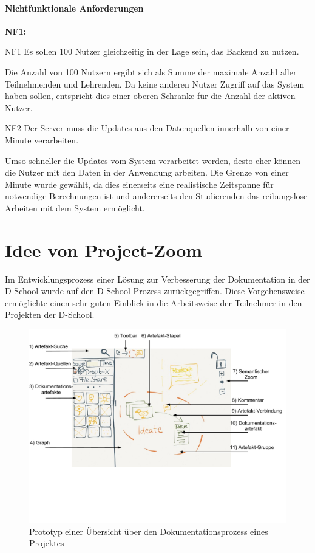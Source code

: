 \paragraph{Nichtfunktionale Anforderungen}
\label{sec:nonfunctional}

\begin{labeling}{\textbf{NF1:}}
  \item[NF1\label{itm:nf1}] Es sollen 100 Nutzer gleichzeitig in der Lage sein, das \gls{Backend} zu nutzen.

  Die Anzahl von 100 Nutzern ergibt sich als Summe der maximale Anzahl aller Teilnehmenden und Lehrenden. Da keine anderen Nutzer Zugriff auf das System haben sollen, entspricht dies einer oberen Schranke für die Anzahl der aktiven Nutzer. 

  \item[NF2\label{itm:nf2}]  Der Server muss die Updates aus den Datenquellen innerhalb von einer Minute verarbeiten.

  Umso schneller die Updates vom System verarbeitet werden, desto eher können die Nutzer mit den Daten in der Anwendung arbeiten. Die Grenze von einer Minute wurde gewählt, da dies einerseits eine realistische Zeitspanne für notwendige Berechnungen ist und andererseits den Studierenden das reibungslose Arbeiten mit dem System ermöglicht.
\end{labeling}


\section{Idee von Project-Zoom}
 
Im Entwicklungsprozess einer Lösung zur Verbesserung der Dokumentation in der D-School wurde auf den D-School-Prozess zurückgegriffen. Diese Vorgehensweise ermöglichte einen sehr guten Einblick in die Arbeitsweise der Teilnehmer in den Projekten der D-School. 

\begin{figure}[ht]  
  \centering     
  \includegraphics[width=1.0\textwidth]{img/projectzoom_prototype.pdf}  
   \caption{Prototyp einer Übersicht über den Dokumentationsprozess eines Projektes}
  \label{fig:projectzoom_prototype} 
\end{figure}

